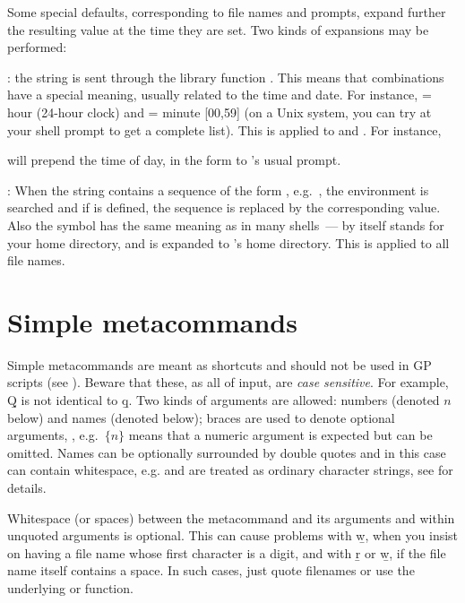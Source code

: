 Some special defaults, corresponding to file names and prompts, expand further
the resulting value at the time they are set. Two kinds of expansions may be
performed:

\item {}: the string is sent through the library
function . This means that \kbd{\%} combinations have
a special meaning, usually related to the time and date. For instance,
 = hour (24-hour clock) and  = minute [00,59] (on a Unix
system, you can try  at your shell prompt to get a complete
list). This is applied to  and . For
instance,


\noindent
will prepend the time of day, in the form 
to 's usual prompt.

\item {}: When the string contains a sequence of
the form , e.g.~, the environment is
searched and if  is defined, the sequence is replaced by the
corresponding value. Also the \kbd{\til} symbol has the same meaning as in
many shells~--- \kbd{\til} by itself stands for your home directory, and
 is expanded to 's home directory. This is applied
to all file names. \label{se:envir}

\section{Simple metacommands}\label{se:meta}

\noindent
Simple metacommands are meant as shortcuts and should not be used in GP
scripts (see ). Beware that these, as all of 
input, are \emph{case sensitive}. For example, \b{Q} is not identical to
\b{q}. Two kinds of arguments are allowed: numbers (denoted $n$ below)
and names (denoted  below); braces are used to denote optional
arguments, , e.g.~$\{n\}$ means that a numeric argument is expected but
can be omitted. Names can be optionally surrounded by double quotes
and in this case can contain whitespace, e.g.  and are treated
as ordinary character strings, see  for details.

Whitespace (or spaces) between the metacommand and its arguments and within
unquoted arguments is optional. This can cause problems with \b{w},
when you insist on having a file name whose first character is a digit, and
with \b{r} or \b{w}, if the file name itself contains a space. In such cases,
just quote filenames or use the underlying  or  function.

